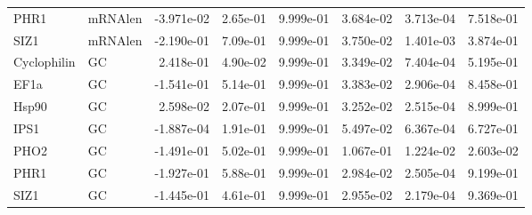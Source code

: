 \documentclass{article}
\begin{document}
\begin{tabular}{llrrrrrr}
PHR1 & mRNAlen & -3.971e-02 & 2.65e-01 & 9.999e-01 & 3.684e-02 & 3.713e-04 & 7.518e-01 \\ 
SIZ1 & mRNAlen & -2.190e-01 & 7.09e-01 & 9.999e-01 & 3.750e-02 & 1.401e-03 & 3.874e-01 \\ 
Cyclophilin & GC &  2.418e-01 & 4.90e-02 & 9.999e-01 & 3.349e-02 & 7.404e-04 & 5.195e-01 \\ 
EF1a & GC & -1.541e-01 & 5.14e-01 & 9.999e-01 & 3.383e-02 & 2.906e-04 & 8.458e-01 \\ 
Hsp90 & GC &  2.598e-02 & 2.07e-01 & 9.999e-01 & 3.252e-02 & 2.515e-04 & 8.999e-01 \\ 
IPS1 & GC & -1.887e-04 & 1.91e-01 & 9.999e-01 & 5.497e-02 & 6.367e-04 & 6.727e-01 \\ 
PHO2 & GC & -1.491e-01 & 5.02e-01 & 9.999e-01 & 1.067e-01 & 1.224e-02 & 2.603e-02 \\ 
PHR1 & GC & -1.927e-01 & 5.88e-01 & 9.999e-01 & 2.984e-02 & 2.505e-04 & 9.199e-01 \\ 
SIZ1 & GC & -1.445e-01 & 4.61e-01 & 9.999e-01 & 2.955e-02 & 2.179e-04 & 9.369e-01 \\ 
\bottomrule
\end{tabular}
\end{document}
